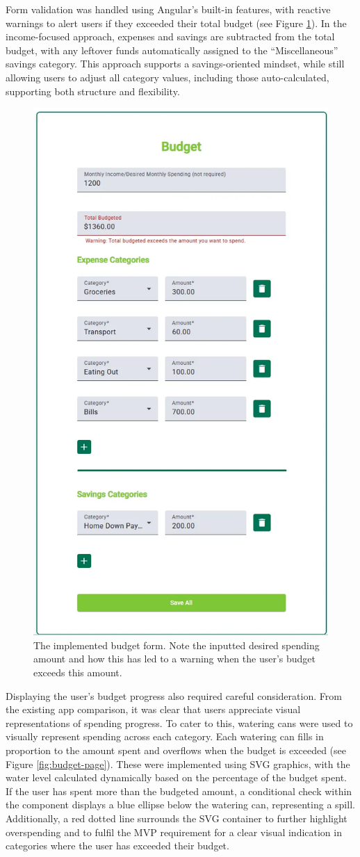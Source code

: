 \documentclass{l4proj}
\begin{document}
Form validation was handled using Angular’s built-in features, with reactive warnings to alert users if they exceeded their total budget (see Figure \ref{fig:budget-form}). In the income-focused approach, expenses and savings are subtracted from the total budget, with any leftover funds automatically assigned to the “Miscellaneous” savings category. This approach supports a savings-oriented mindset, while still allowing users to adjust all category values, including those auto-calculated, supporting both structure and flexibility.

\begin{figure}[htb]
    \centering
    \includegraphics[width=0.3\linewidth]{images/UI-Screenshots/budget-form.png}
    \caption{The implemented budget form. Note the inputted desired spending amount and how this has led to a warning when the user's budget exceeds this amount.}
    \label{fig:budget-form}
\end{figure}

Displaying the user’s budget progress also required careful consideration. From the existing app comparison, it was clear that users appreciate visual representations of spending progress. To cater to this, watering cans were used to visually represent spending across each category. Each watering can fills in proportion to the amount spent and overflows when the budget is exceeded (see Figure \ref{fig:budget-page}). These were implemented using SVG graphics, with the water level calculated dynamically based on the percentage of the budget spent. If the user has spent more than the budgeted amount, a conditional check within the component displays a blue ellipse below the watering can, representing a spill. Additionally, a red dotted line surrounds the SVG container to further highlight overspending and to fulfil the MVP requirement for a clear visual indication in categories where the user has exceeded their budget.
\end{document}
